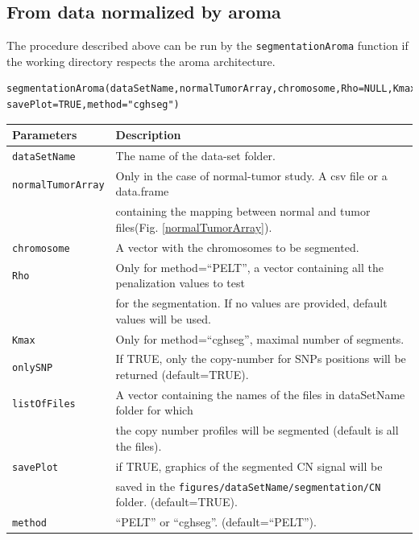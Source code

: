 \documentclass[a4paper,10pt]{article}
\begin{document}
	
	\subsection{From data normalized by aroma}	
		
		The procedure described above can be run by the \texttt{segmentationAroma} function if the working directory respects the aroma architecture.
		 	
		\begin{verbatim}	
segmentationAroma(dataSetName,normalTumorArray,chromosome,Rho=NULL,Kmax=10,listOfFiles=NULL,onlySNP=TRUE,
savePlot=TRUE,method="cghseg")
		\end{verbatim}
	
		\begin{center}
			\begin{tabular}{|l|l|}
				\hline
				Parameters & Description\\
				\hline
				\texttt{dataSetName} & The name of the data-set folder.\\
				\texttt{normalTumorArray} & Only in the case of normal-tumor study. A csv file or a data.frame\\
				~~ & containing the mapping between normal and tumor files(Fig. \ref{normalTumorArray}).\\
				\texttt{chromosome} & A vector with the chromosomes to be segmented.\\
				\texttt{Rho} & Only for method=``PELT'', a vector containing all the penalization values to test \\
				~ &  for the segmentation. If no values are provided, default values will be used.\\
        \texttt{Kmax} & Only for method=``cghseg'', maximal number of segments.\\
				\texttt{onlySNP} & If TRUE, only the copy-number for SNPs positions will be returned (default=TRUE).\\
				\texttt{listOfFiles} & A vector containing the names of the files in dataSetName folder for which\\
				~ & the copy number profiles  will be segmented (default is all the files).\\
				\texttt{savePlot} & if TRUE, graphics of the segmented CN signal will be\\
				~~ & saved in the \texttt{figures/dataSetName/segmentation/CN} folder. (default=TRUE).\\
				\texttt{method} & ``PELT'' or ``cghseg''. (default=``PELT'').\\
				\hline
			\end{tabular}		
		\end{center}
	
\end{document}
